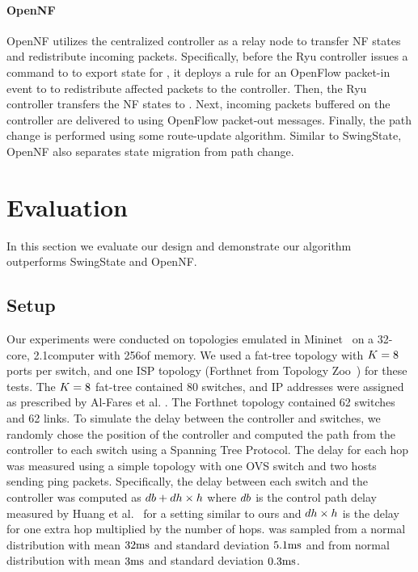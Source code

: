 \paragraph{OpenNF}
OpenNF utilizes the centralized controller as a relay node to transfer
NF states and redistribute incoming packets. Specifically, before the
Ryu controller issues a command to \oldSwitchID{\nfIdx} to export
state for \nfID{\nfIdx}, it deploys a rule for an OpenFlow packet-in
event to \oldSwitchID{\nfIdx} to redistribute affected packets to the
controller. Then, the Ryu controller transfers the NF states to
\newSwitchID{\nfIdx}.  Next, incoming packets buffered on the
controller are delivered to \newSwitchID{\nfIdx} using OpenFlow
packet-out messages.  Finally, the path change is performed using some
route-update algorithm.  Similar to SwingState, OpenNF also separates
state migration from path change.


\section{Evaluation}
\label{sec:evaluation}

In this section we evaluate our design and demonstrate our algorithm
outperforms SwingState and OpenNF.

\subsection{Setup}
Our experiments were conducted on topologies emulated in
Mininet~\cite{Mininet} on a 32-core, 2.1\gigahertz computer with
256\gigabytes of memory. We used a fat-tree topology with
$K = 8$ ports per switch, and one ISP topology (Forthnet
from Topology Zoo~\cite{ISP}) for these tests. The $K =
8$ fat-tree contained 80 switches, and IP addresses were assigned as
prescribed by Al-Fares et al. \cite{FatTree}. The Forthnet topology
contained 62 switches and 62 links. To simulate the delay between the
controller and switches, we randomly chose the position of the
controller and computed the path from the controller to each switch
using a Spanning Tree Protocol.  The delay for each hop was measured
using a simple topology with one OVS switch and two hosts sending ping
packets.  Specifically, the delay between each switch and the
controller was computed as $db + dh \times
h$ where $db$ is the control path delay measured by
Huang et al.~\cite{switchSimulator} for a setting similar to ours and
$dh \times h$ is the delay for one extra hop
multiplied by the number of hops.  \delayBase was sampled from a
normal distribution with mean $32\textrm{ms}$ and standard deviation
$5.1\textrm{ms}$ and \oneHopDelay from normal distribution with mean
$3\textrm{ms}$ and standard deviation $0.3\textrm{ms}$.

